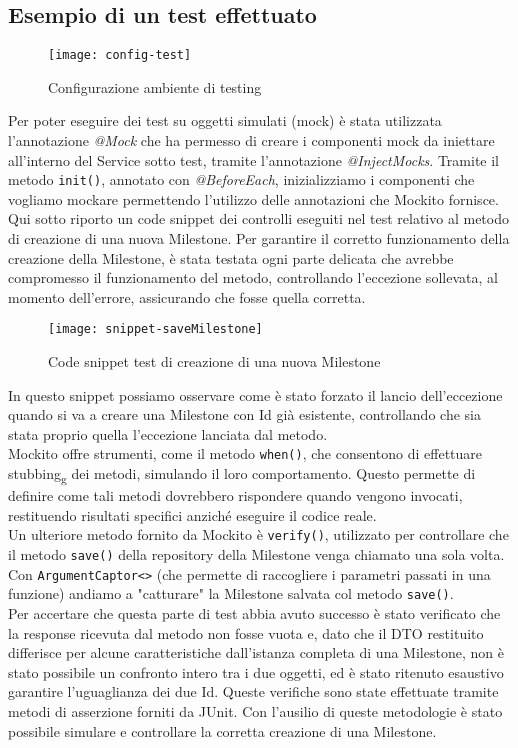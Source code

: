 \subsection{Esempio di un test effettuato}
\begin{figure}[H] 
    \centering 
    \texttt{[image: config-test]} 
    \caption{Configurazione ambiente di testing}
\end{figure}
Per poter eseguire dei test su oggetti simulati (mock) è stata utilizzata l'annotazione \textit{@Mock} che ha permesso di creare i componenti mock da iniettare all’interno del Service sotto test, tramite l’annotazione \textit{@InjectMocks}. Tramite il metodo \texttt{init()}, annotato con \textit{@BeforeEach}, inizializziamo i componenti che vogliamo mockare permettendo l’utilizzo delle annotazioni che Mockito fornisce.\\
Qui sotto riporto un code snippet dei controlli eseguiti nel test relativo al metodo di creazione di una nuova Milestone. Per garantire il corretto funzionamento della creazione della Milestone, è stata testata ogni parte delicata che avrebbe compromesso il funzionamento del metodo, controllando l’eccezione sollevata, al momento dell’errore, assicurando che fosse quella corretta.\\

\begin{figure}[H] 
    \centering 
    \texttt{[image: snippet-saveMilestone]} 
    \caption{Code snippet test di creazione di una nuova Milestone}
\end{figure}

\noindent In questo snippet possiamo osservare come è stato forzato il lancio dell’eccezione quando si va a creare una Milestone con Id già esistente, controllando che sia stata proprio quella l’eccezione lanciata dal metodo.\\
Mockito offre strumenti, come il metodo \texttt{when()}, che consentono di effettuare stubbing\textsubscript{g} dei metodi, simulando il loro comportamento. Questo permette di definire come tali metodi dovrebbero rispondere quando vengono invocati, restituendo risultati specifici anziché eseguire il codice reale.\\ 
Un ulteriore metodo fornito da Mockito è \texttt{verify()}, utilizzato per controllare che il metodo \texttt{save()} della repository della Milestone venga chiamato una sola volta. Con \texttt{ArgumentCaptor<>} (che permette di raccogliere i parametri passati in una funzione) andiamo a "catturare" la Milestone salvata col metodo \texttt{save()}.\\
Per accertare che questa parte di test abbia avuto successo è stato verificato che la response ricevuta dal metodo non fosse vuota e, dato che il DTO restituito differisce per alcune caratteristiche dall’istanza completa di una Milestone, non è stato possibile un confronto intero tra i due oggetti, ed è stato ritenuto esaustivo garantire l’uguaglianza dei due Id. Queste verifiche sono state effettuate tramite metodi di asserzione forniti da JUnit.
Con l’ausilio di queste metodologie è stato possibile simulare e controllare la corretta creazione di una Milestone.\\

